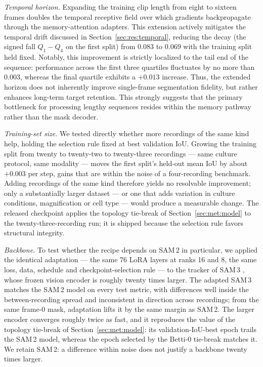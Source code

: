 \documentclass[11pt,a4paper]{article}
\begin{document}
\emph{Temporal horizon.} Expanding the training clip length from eight to
sixteen frames doubles the temporal receptive field over which gradients
backpropagate through the memory-attention adapters. This extension actively
mitigates the temporal drift discussed in Section~\ref{sec:res:temporal},
reducing the decay (the signed fall $Q_1 - Q_4$ on the first split) from
$0.083$ to $0.069$ with the training split held fixed. Notably, this improvement is
strictly localized to the tail end of the sequence: performance across the
first three quartiles fluctuates by no more than $0.003$, whereas the final
quartile exhibits a $+0.013$ increase. Thus, the extended horizon does not
inherently improve single-frame segmentation fidelity, but rather enhances
long-term target retention. This strongly suggests that the primary
bottleneck for processing lengthy sequences resides within the memory pathway
rather than the mask decoder.

\emph{Training-set size.} We tested directly whether more recordings of the
same kind help, holding the selection rule fixed at best validation IoU.
Growing the training split from twenty to twenty-two to twenty-three
recordings --- same culture protocol, same modality --- moves the first
split's held-out mean IoU by about $+0.003$ per step, gains that are within
the noise of a four-recording benchmark. Adding
recordings of the same kind therefore yields no resolvable improvement; only
a substantially larger dataset --- or one that adds variation in culture
conditions, magnification or cell type --- would produce a measurable change.
The released checkpoint applies the topology tie-break of
Section~\ref{sec:met:model} to the twenty-three-recording run; it is shipped
because the selection rule favors structural integrity.

\emph{Backbone.} To test whether the recipe depends on SAM\,2 in particular,
we applied the identical adaptation --- the same 76 LoRA layers at ranks 16
and 8, the same loss, data, schedule and checkpoint-selection rule --- to the
tracker of SAM\,3 \cite{carion2025sam3}, whose frozen vision encoder is
roughly twenty times larger. The adapted SAM\,3 matches the SAM\,2 model on
every test metric, with differences well inside the between-recording spread
and inconsistent in direction across recordings; from the same frame-0 mask,
adaptation lifts it by the same margin as SAM\,2. The larger encoder
converges roughly twice as fast, and it reproduces the value of the topology
tie-break of Section~\ref{sec:met:model}: its validation-IoU-best epoch
trails the SAM\,2 model, whereas the epoch selected by the Betti-0 tie-break
matches it. We retain SAM\,2: a difference within noise does not justify a
backbone twenty times larger.
\end{document}
